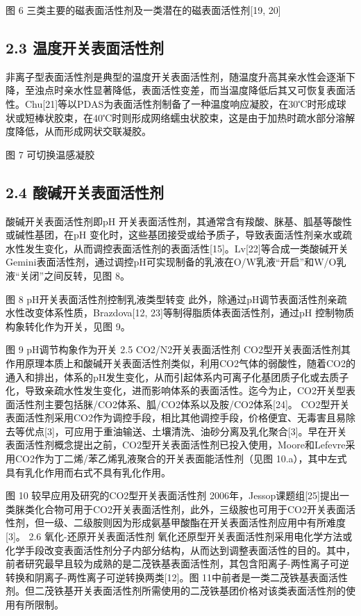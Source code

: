 \documentclass[bachelor,winfonts]{jnuthesis}
\begin{document}
    图 6 三类主要的磁表面活性剂及一类潜在的磁表面活性剂[19, 20]
\subsection{    2.3 温度开关表面活性剂}
    非离子型表面活性剂是典型的温度开关表面活性剂，随温度升高其亲水性会逐渐下降，至浊点时亲水性显著降低，表面活性变差，而当温度降低后其又可恢复表面活性。Chu[21]等以PDAS为表面活性剂制备了一种温度响应凝胶，在30℃时形成球状或短棒状胶束，在40℃时则形成网络蠕虫状胶束，这是由于加热时疏水部分溶解度降低，从而形成网状交联凝胶。
    
    图 7 可切换温感凝胶
\subsection{    2.4 酸碱开关表面活性剂}
    酸碱开关表面活性剂即pH 开关表面活性剂，其通常含有羧酸、脒基、胍基等酸性或碱性基团，在pH 变化时，这些基团接受或给予质子，导致表面活性剂亲水或疏水性发生变化，从而调控表面活性剂的表面活性[15]。Lv[22]等合成一类酸碱开关Gemini表面活性剂，通过调控pH可实现制备的乳液在O/W乳液“开启”和W/O乳液“关闭”之间反转，见图 8。
    
    图 8 pH开关表面活性剂控制乳液类型转变
    此外，除通过pH调节表面活性剂亲疏水性改变体系性质，Brazdova[12, 23]等制得脂质体表面活性剂，通过pH 控制物质构象转化作为开关，见图 9。
    
    图 9 pH调节构象作为开关
    2.5 CO2/N2开关表面活性剂
    CO2型开关表面活性剂其作用原理本质上和酸碱开关表面活性剂类似，利用CO2气体的弱酸性，随着CO2的通入和排出，体系的pH发生变化，从而引起体系内可离子化基团质子化或去质子化，导致亲疏水性发生变化，进而影响体系的表面活性。迄今为止，CO2开关型表面活性剂主要包括脒/CO2体系、胍/CO2体系以及胺/CO2体系[24]。
    CO2型开关表面活性剂采用CO2作为调控手段，相比其他调控手段，价格便宜、无毒害且易除去等优点[3]，可应用于重油输送、土壤清洗、油砂分离及乳化聚合[3]。早在开关表面活性剂概念提出之前，CO2型开关表面活性剂已投入使用，Moore和Lefevre采用CO2作为丁二烯/苯乙烯乳液聚合的开关表面能活性剂（见图 10.a），其中左式具有乳化作用而右式不具有乳化作用。
    
    图 10 较早应用及研究的CO2型开关表面活性剂
    2006年，Jessop课题组[25]提出一类脒类化合物可用于CO2开关表面活性剂，此外，三级胺也可用于CO2开关表面活性剂，但一级、二级胺则因为形成氨基甲酸酯在开关表面活性剂应用中有所难度[3]。
    2.6 氧化-还原开关表面活性剂
    氧化还原型开关表面活性剂采用电化学方法或化学手段改变表面活性剂分子内部分结构，从而达到调整表面活性的目的。其中，前者研究最早且较为成熟的是二茂铁基表面活性剂，其包含阳离子-两性离子可逆转换和阴离子-两性离子可逆转换两类[12]。图 11中前者是一类二茂铁基表面活性剂。但二茂铁基开关表面活性剂所需使用的二茂铁基团价格对该类表面活性剂的使用有所限制。
    
\end{document}
